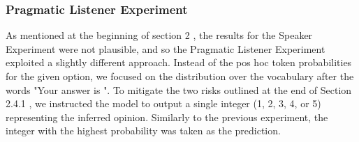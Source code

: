 \documentclass[11pt]{article}
\begin{document}
\subsubsection{Pragmatic Listener Experiment}
\label{sec:exp3}


As mentioned at the beginning of section 2 , the results for the Speaker Experiment were not plausible, and so the Pragmatic Listener Experiment exploited a slightly different approach. Instead of the pos hoc token probabilities for the given option, we focused on the distribution over the vocabulary after the words "Your answer is ". To mitigate the two risks outlined at the end of Section 2.4.1 , we instructed the model to output a single integer (1, 2, 3, 4, or 5) representing the inferred opinion. %
Similarly to the previous experiment, the integer with the highest probability was taken as the prediction.



\end{document}
